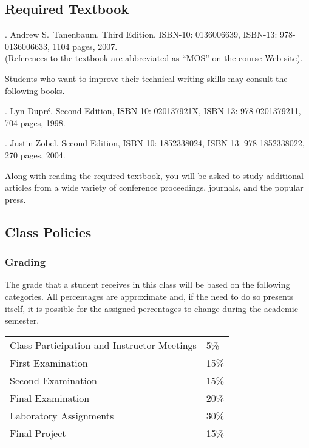 \subsection*{Required Textbook}

. Andrew S.\ Tanenbaum.
Third Edition, ISBN-10: 0136006639, ISBN-13: 978-0136006633, 1104 pages, 2007. \\
(References to the textbook are abbreviated as ``MOS'' on the course Web site).

\noindent
Students who want to improve their technical writing skills may consult the following books.

. Lyn Dupr\'e. Second Edition,  ISBN-10: 020137921X,
ISBN-13: 978-0201379211, 704 pages, 1998.

.  Justin Zobel. Second Edition,  ISBN-10: 1852338024, ISBN-13:
978-1852338022, 270 pages, 2004.

\noindent
Along with reading the required textbook, you will be asked to study additional articles from a wide variety of
conference proceedings, journals, and the popular press.

\subsection*{Class Policies}

\subsubsection*{Grading}

The grade that a student receives in this class will be based on the following categories. All percentages are
approximate and, if the need to do so presents itself, it is possible for the assigned percentages to change during the
academic semester.

\begin{center}
  \begin{tabular}{ll}
    Class Participation and Instructor Meetings & 5\% \\
    First Examination & 15\% \\
    Second Examination & 15\% \\
    Final Examination & 20\% \\
    Laboratory Assignments & 30\% \\
    Final Project & 15\%
  \end{tabular}
\end{center}

